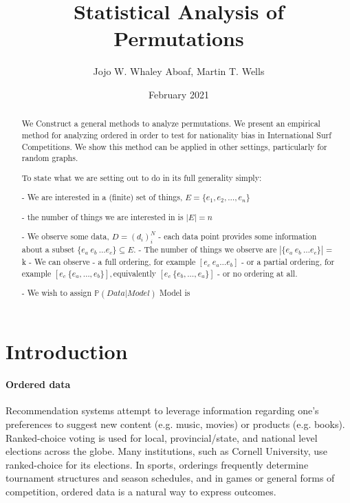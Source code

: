 \documentclass{article}
\title{Statistical Analysis of Permutations}
\author{Jojo W. Whaley Aboaf, Martin T. Wells}
\date{February 2021}
\theoremstyle{definition}
\begin{document}
\maketitle
\tableofcontents

\begin{abstract}
We Construct a general methods to analyze permutations.
We present an empirical method for analyzing ordered in order to test for nationality bias in International Surf Competitions.
We show this method can be applied in other settings, particularly for random graphs.

To state what we are setting out to do in its full generality simply:

- We are interested in a (finite) set of things, $E = \{e_1, e_2, \dots, e_n \} $
	
		- the number of things we are interested in is $|E| = n$

- We observe some data, $D = (d_i)_i^N$
		- each data point provides some information about a subset $ \{ e_a \: e_b \: \dots e_c \} \subseteq E$.
		- The number of things we observe are $|\{ e_a \: e_b \: \dots e_c \} |$ = k
        - We can observe
        	- a full ordering, for example $ [e_c \:  e_a \dots e_b] $
			- or a partial ordering, for example $ [e_c \: \{e_a, \dots, e_b\}], $equivalently $  [e_c \: \{e_b, \dots, e_a\}] $
            - or no ordering at all.
            
- We wish to assign $\mathbb{P}(Data | Model)$
Model  is 

\end{abstract}


\section{Introduction}

\paragraph{Ordered data} Recommendation systems attempt to leverage information regarding one’s preferences to suggest new content (e.g. music, movies) or products (e.g. books). Ranked-choice voting is used for local, provincial/state, and national level elections across the globe. Many institutions, such as Cornell University, use ranked-choice for its elections. In sports, orderings frequently determine tournament structures and season schedules, and in games or general forms of competition, ordered data is a natural way to express outcomes.
\end{document}
